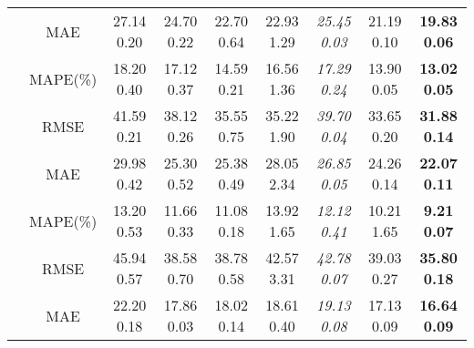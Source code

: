 \documentclass[letterpaper]{article} \usepackage{aaai21}  \usepackage{times}  \usepackage{helvet} \usepackage{courier}  \usepackage[hyphens]{url}  \usepackage{graphicx} \urlstyle{rm} \def\UrlFont{\rm}  \usepackage{natbib}  \usepackage{caption} \frenchspacing  \setlength{\pdfpagewidth}{8.5in}  \setlength{\pdfpageheight}{11in}  \usepackage{multirow}
\begin{document}
\begin{table*}[!htb]
{\begin{tabular}{ccccccccc}
			\multicolumn{1}{c|}{\multirow{3}{*}{\shortstack{PEMS04}}} & \multicolumn{1}{c|}{MAE}                & 27.14  0.20                   & 24.70  0.22                  & 22.70  0.64                  & 22.93  1.29                      & \textit{25.45  0.03}                & 21.19  0.10                  & \textbf{19.83 0.06}          \\ 
			\multicolumn{1}{c|}{}                        & \multicolumn{1}{c|}{MAPE(\%)}                & 18.20  0.40                    & 17.12  0.37                  & 14.59  0.21                 & 16.56  1.36                      & \textit{17.29  0.24}                & 13.90  0.05                   & \textbf{13.02 0.05}          \\ 
			\multicolumn{1}{c|}{}                        & \multicolumn{1}{c|}{RMSE}                & 41.59  0.21                   & 38.12  0.26                  & 35.55  0.75                  & 35.22  1.90                      & \textit{39.70  0.04}                & 33.65  0.20                   & \textbf{31.88 0.14}          \\ \hline
			\multicolumn{1}{c|}{\multirow{3}{*}{\shortstack{PEMS07}}} & \multicolumn{1}{c|}{MAE}                & 29.98  0.42                    & 25.30  0.52                  & 25.38  0.49                 & 28.05  2.34                      & \textit{26.85  0.05}                & 24.26  0.14                   & \textbf{22.07 0.11}          \\ 
			\multicolumn{1}{c|}{}                        & \multicolumn{1}{c|}{MAPE(\%)}                & 13.20  0.53                    & 11.66  0.33                  & 11.08  0.18                 & 13.92  1.65                     & \textit{12.12  0.41}                & 10.21  1.65                   & \textbf{9.21 0.07}           \\ 
			\multicolumn{1}{c|}{}                        & \multicolumn{1}{c|}{RMSE}                & 45.94  0.57                    & 38.58  0.70                 & 38.78  0.58                 & 42.57  3.31                      & \textit{42.78  0.07}                & 39.03  0.27                   & \textbf{35.80 0.18}          \\ \hline
			\multicolumn{1}{c|}{\multirow{3}{*}{\shortstack{PEMS08}}} & \multicolumn{1}{c|}{MAE}                & 22.20  0.18                   & 17.86  0.03                  & 18.02  0.14                  & 18.61  0.40                      & \textit{19.13  0.08}                & 17.13  0.09                   & \textbf{16.64 0.09}          \\  

\end{tabular}}
\end{table*}
\end{document}
